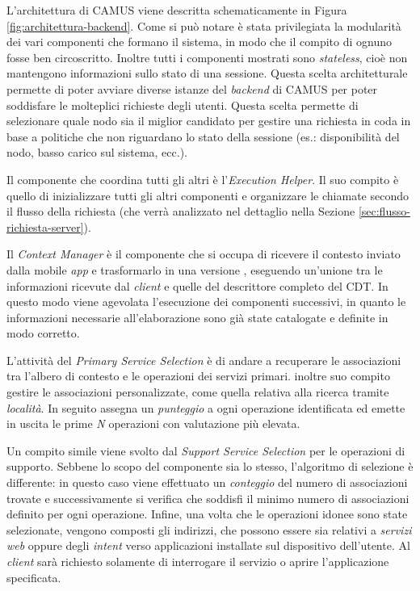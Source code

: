 L'architettura di CAMUS viene descritta schematicamente in Figura \ref{fig:architettura-backend}. Come si può notare è stata privilegiata la modularità dei vari componenti che formano il sistema, in modo che il compito di ognuno fosse ben circoscritto. Inoltre tutti i componenti mostrati sono \emph{stateless}, cioè non mantengono informazioni sullo stato di una sessione. Questa scelta architetturale permette di poter avviare diverse istanze del \emph{backend} di CAMUS per poter soddisfare le molteplici richieste degli utenti. Questa scelta permette di selezionare quale nodo sia il miglior candidato per gestire una richiesta in coda in base a politiche che non riguardano lo stato della sessione (es.: disponibilità del nodo, basso carico sul sistema, ecc.).

Il componente che coordina tutti gli altri è l'\emph{Execution Helper}. Il suo compito è quello di inizializzare tutti gli altri componenti e organizzare le chiamate secondo il flusso della richiesta (che verrà analizzato nel dettaglio nella Sezione \ref{sec:flusso-richiesta-server}).

Il \emph{Context Manager} è il componente che si occupa di ricevere il contesto inviato dalla mobile \emph{app} e trasformarlo in una versione , eseguendo un'unione tra le informazioni ricevute dal \emph{client} e quelle del descrittore completo del CDT. In questo modo viene agevolata l'esecuzione dei componenti successivi, in quanto le informazioni necessarie all'elaborazione sono già state catalogate e definite in modo corretto.

L'attività del \emph{Primary Service Selection} è di andare a recuperare le associazioni tra l'albero di contesto e le operazioni dei servizi primari. \upe inoltre suo compito gestire le associazioni personalizzate, come quella relativa alla ricerca tramite \emph{località}. In seguito assegna un \emph{punteggio} a ogni operazione identificata ed emette in uscita le prime \emph{N} operazioni con valutazione più elevata.

Un compito simile viene svolto dal \emph{Support Service Selection} per le operazioni di supporto. Sebbene lo scopo del componente sia lo stesso, l'algoritmo di selezione è differente: in questo caso viene effettuato un \emph{conteggio} del numero di associazioni trovate e successivamente si verifica che soddisfi il minimo numero di associazioni definito per ogni operazione. Infine, una volta che le operazioni idonee sono state selezionate, vengono composti gli indirizzi, che possono essere sia relativi a \emph{servizi web} oppure degli \emph{intent} verso applicazioni installate sul dispositivo dell'utente. Al \emph{client} sarà richiesto solamente di interrogare il servizio o aprire l'applicazione specificata.

